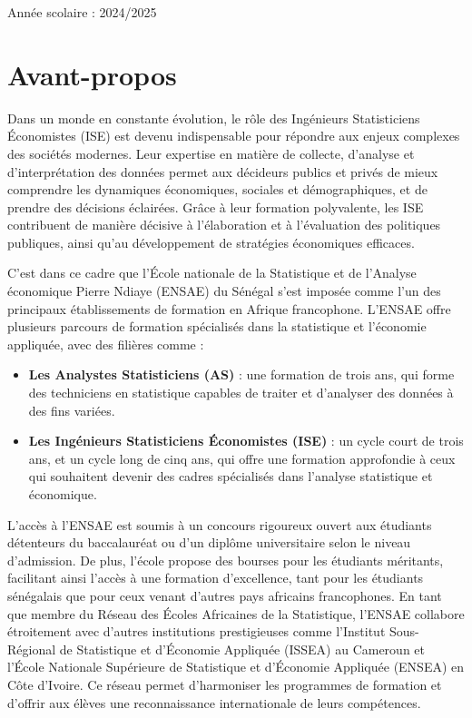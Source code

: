 \documentclass[
]{article}
\providecommand{\tightlist}{%
  \setlength{\itemsep}{0pt}\setlength{\parskip}{0pt}}
\begin{document}
\begin{titlepage}
\begin{center}
        \vfill

        {\large \textsf{Année scolaire : 2024/2025}}\\[0.5cm]
        
    \end{center}
\end{titlepage}

\section*{Avant-propos}

Dans un monde en constante évolution, le rôle des Ingénieurs
Statisticiens Économistes (ISE) est devenu indispensable pour répondre
aux enjeux complexes des sociétés modernes. Leur expertise en matière de
collecte, d'analyse et d'interprétation des données permet aux décideurs
publics et privés de mieux comprendre les dynamiques économiques,
sociales et démographiques, et de prendre des décisions éclairées. Grâce
à leur formation polyvalente, les ISE contribuent de manière décisive à
l'élaboration et à l'évaluation des politiques publiques, ainsi qu'au
développement de stratégies économiques efficaces.

C'est dans ce cadre que l'École nationale de la Statistique et de
l'Analyse économique Pierre Ndiaye (ENSAE) du Sénégal s'est imposée
comme l'un des principaux établissements de formation en Afrique
francophone. L'ENSAE offre plusieurs parcours de formation spécialisés
dans la statistique et l'économie appliquée, avec des filières comme :

\begin{itemize}
\tightlist
\item
  \textbf{Les Analystes Statisticiens (AS)} : une formation de trois
  ans, qui forme des techniciens en statistique capables de traiter et
  d'analyser des données à des fins variées.
\item
  \textbf{Les Ingénieurs Statisticiens Économistes (ISE)} : un cycle
  court de trois ans, et un cycle long de cinq ans, qui offre une
  formation approfondie à ceux qui souhaitent devenir des cadres
  spécialisés dans l'analyse statistique et économique.
\end{itemize}

L'accès à l'ENSAE est soumis à un concours rigoureux ouvert aux
étudiants détenteurs du baccalauréat ou d'un diplôme universitaire selon
le niveau d'admission. De plus, l'école propose des bourses pour les
étudiants méritants, facilitant ainsi l'accès à une formation
d'excellence, tant pour les étudiants sénégalais que pour ceux venant
d'autres pays africains francophones. En tant que membre du Réseau des
Écoles Africaines de la Statistique, l'ENSAE collabore étroitement avec
d'autres institutions prestigieuses comme l'Institut Sous-Régional de
Statistique et d'Économie Appliquée (ISSEA) au Cameroun et l'École
Nationale Supérieure de Statistique et d'Économie Appliquée (ENSEA) en
Côte d'Ivoire. Ce réseau permet d'harmoniser les programmes de formation
et d'offrir aux élèves une reconnaissance internationale de leurs
compétences.
\end{document}
